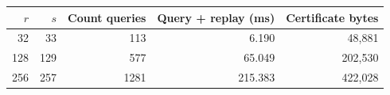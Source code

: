 \begin{tabular}{@{}rrrrr@{}}
\toprule
$r$ & $s$ & Count queries & Query + replay (ms) & Certificate bytes\\
\midrule
32 & 33 & 113 & 6.190 & 48,881\\
128 & 129 & 577 & 65.049 & 202,530\\
256 & 257 & 1281 & 215.383 & 422,028\\
\bottomrule
\end{tabular}
